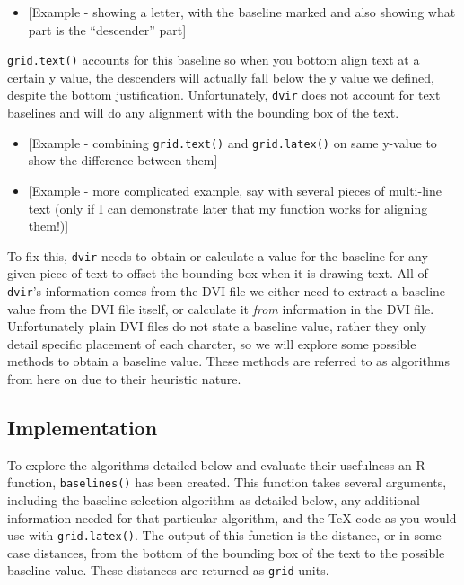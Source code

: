 \documentclass[]{article}
\providecommand{\tightlist}{%
  \setlength{\itemsep}{0pt}\setlength{\parskip}{0pt}}
\begin{document}
\begin{itemize}
\tightlist
\item
  {[}Example - showing a letter, with the baseline marked and also
  showing what part is the ``descender'' part{]}
\end{itemize}

\texttt{grid.text()} accounts for this baseline so when you bottom align
text at a certain y value, the descenders will actually fall below the y
value we defined, despite the bottom justification. Unfortunately,
\texttt{dvir} does not account for text baselines and will do any
alignment with the bounding box of the text.

\begin{itemize}
\item
  {[}Example - combining \texttt{grid.text()} and \texttt{grid.latex()}
  on same y-value to show the difference between them{]}
\item
  {[}Example - more complicated example, say with several pieces of
  multi-line text (only if I can demonstrate later that my function
  works for aligning them!){]}
\end{itemize}

To fix this, \texttt{dvir} needs to obtain or calculate a value for the
baseline for any given piece of text to offset the bounding box when it
is drawing text. All of \texttt{dvir}'s information comes from the DVI
file we either need to extract a baseline value from the DVI file
itself, or calculate it \emph{from} information in the DVI file.
Unfortunately plain DVI files do not state a baseline value, rather they
only detail specific placement of each charcter, so we will explore some
possible methods to obtain a baseline value. These methods are referred
to as algorithms from here on due to their heuristic nature.

\subsection{Implementation}\label{implementation}

To explore the algorithms detailed below and evaluate their usefulness
an R function, \texttt{baselines()} has been created. This function
takes several arguments, including the baseline selection algorithm as
detailed below, any additional information needed for that particular
algorithm, and the \TeX{} code as you would use with
\texttt{grid.latex()}. The output of this function is the distance, or
in some case distances, from the bottom of the bounding box of the text
to the possible baseline value. These distances are returned as
\texttt{grid} units.
\end{document}
